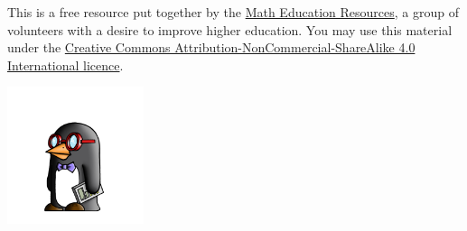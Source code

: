 \vfill

\begin{multicols}{2}
\hfill \begin{minipage}{0.45\textwidth}This is a free resource put together by the \href{http://www.math-education-resources.com}{Math Education Resources}, a group of volunteers with a desire to improve higher education. You may use this material under the \href{https://creativecommons.org/licenses/by-nc-sa/4.0/}{Creative Commons Attribution-NonCommercial-ShareAlike 4.0 International licence}.

\end{minipage}

\columnbreak

\begin{center}
\includegraphics[width=0.3\textwidth]{MER_penguin_left.png}
\end{center}

\vfill

\end{multicols}
